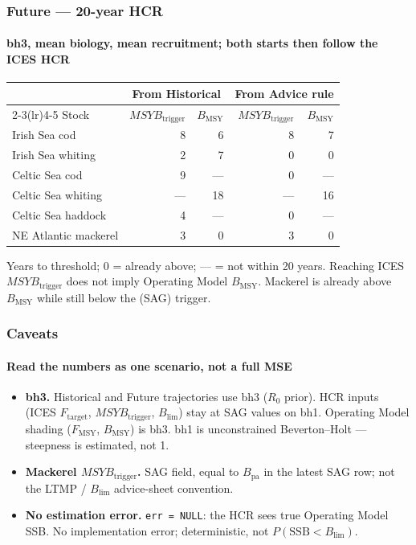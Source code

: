 \documentclass[
  aspectratio=169,
  t,
  onlytextwidth,
  10pt,
]{beamer}
\newcommand{\Ftar}{F_{\mathrm{target}}}
\newcommand{\Blim}{B_{\lim}}
\newcommand{\Btrig}{MSYB_{\mathrm{trigger}}}
\newcommand{\Bmsy}{B_{\mathrm{MSY}}}
\begin{document}
\begin{frame}
  \frametitle{Future --- 20-year HCR}
  \framesubtitle{bh3, mean biology, mean recruitment; both starts then follow the ICES HCR}

  {\footnotesize
  \begin{tabular}{@{}l rr rr@{}}
    \toprule
    & \multicolumn{2}{c}{From Historical} & \multicolumn{2}{c}{From Advice rule} \\
    \cmidrule(lr){2-3}\cmidrule(lr){4-5}
    Stock & $\Btrig$ & $\Bmsy$ & $\Btrig$ & $\Bmsy$ \\
    \midrule
    Irish Sea cod        & 8  & 6  & 8  & 7  \\
    Irish Sea whiting    & 2  & 7  & 0  & 0  \\
    Celtic Sea cod       & 9  & --- & 0  & --- \\
    Celtic Sea whiting   & --- & 18 & --- & 16 \\
    Celtic Sea haddock   & 4  & --- & 0  & --- \\
    NE Atlantic mackerel & 3  & 0  & 3  & 0  \\
    \bottomrule
  \end{tabular}}

  \vspace{0.4em}
  Years to threshold; $0$ = already above; --- = not within 20 years.
  Reaching ICES $\Btrig$ does not imply Operating Model $\Bmsy$.
  Mackerel is already above $\Bmsy$ while still below the (SAG) trigger.
\end{frame}

\begin{frame}
  \frametitle{Caveats}
  \framesubtitle{Read the numbers as one scenario, not a full MSE}

  \begin{itemize}
    \item \textbf{bh3.} Historical and Future trajectories use bh3
          ($R_0$ prior). HCR inputs (ICES $\Ftar$, $\Btrig$, $\Blim$) stay
          at SAG values on bh1. Operating Model shading ($F_{\mathrm{MSY}}$, $\Bmsy$)
          is bh3. bh1 is unconstrained Beverton--Holt --- steepness is
          estimated, not 1.
    \item \textbf{Mackerel $\Btrig$.} SAG field, equal to $B_{\mathrm{pa}}$ in
          the latest SAG row; not the LTMP / $\Blim$ advice-sheet convention.
    \item \textbf{No estimation error.} \texttt{err = NULL}: the HCR sees true Operating Model SSB.
          No implementation error; deterministic, not $P(\mathrm{SSB}{<}\Blim)$.
  \end{itemize}
\end{frame}
\end{document}
